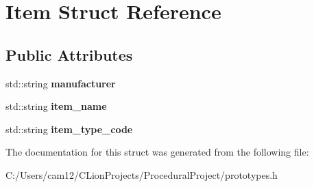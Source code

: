 \hypertarget{struct_item}{}\section{Item Struct Reference}
\label{struct_item}
\subsection*{Public Attributes}
\begin{DoxyCompactItemize}
\item 
\mbox{\label{struct_item_ae051e4151f4a4498a7737fe859bb3fc1}} 
std\+::string {\bfseries manufacturer}
\item 
\mbox{\label{struct_item_ab50a9f24197558b467a64c5576d1c8c7}} 
std\+::string {\bfseries item\+\_\+name}
\item 
\mbox{\label{struct_item_a3f7d6425eca857391589d0a1e4a17417}} 
std\+::string {\bfseries item\+\_\+type\+\_\+code}
\end{DoxyCompactItemize}


The documentation for this struct was generated from the following file\+:\begin{DoxyCompactItemize}
\item 
C\+:/\+Users/cam12/\+C\+Lion\+Projects/\+Procedural\+Project/prototypes.\+h\end{DoxyCompactItemize}
